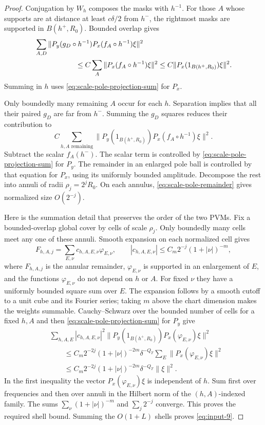 \begin{proof}
Conjugation by $W_h$ composes the masks with $h^{-1}$.  For those
$A$ whose supports are at distance at least $c\delta/2$ from $h^-$,
the rightmost masks are supported in $B(h^+,R_0)$.  Bounded overlap
gives
\begin{align*}
 &\sum_{A,D}
 \|P_y(g_D\circ h^{-1})P_x(f_A\circ h^{-1})\xi\|^2\\
 &\hspace{20mm}\le
 C\sum_A\|P_x(f_A\circ h^{-1})\xi\|^2
 \le C\|P_x(1_{B(h^+,R_0)})\xi\|^2.
\end{align*}
Summing in $h$ uses \eqref{eq:scale-pole-projection-sum} for $P_x$.

Only boundedly many remaining $A$ occur for each $h$.  Separation
implies that all their paired $g_D$ are far from $h^-$.  Summing the
$g_D$ squares reduces their contribution to
\[
 C\sum_{h,A\text{ remaining}}
 \|P_y(1_{B(h^+,R_0)})P_x(f_A\circ h^{-1})\xi\|^2.
\]
Subtract the scalar $f_A(h^-)$.  The scalar term is controlled by
\eqref{eq:scale-pole-projection-sum} for $P_y$.  The remainder in an
enlarged pole ball is controlled by that equation for $P_x$, using
its uniformly bounded amplitude.  Decompose the rest into annuli of
radii $\rho_j=2^jR_0$.  On each annulus,
\eqref{eq:scale-pole-remainder} gives normalized size $O(2^{-j})$.

Here is the summation detail that preserves the order of the two
PVMs.  Fix a bounded-overlap global cover by cells of scale $\rho_j$.
Only boundedly many cells meet any one of these annuli.  Smooth
expansion on each normalized cell gives
\[
 F_{h,A,j}=
 \sum_{E,\nu}c_{h,A,E,\nu}\varphi_{E,\nu},\qquad
 |c_{h,A,E,\nu}|
 \le C_m2^{-j}(1+|\nu|)^{-m},
\]
where $F_{h,A,j}$ is the annular remainder,
$\varphi_{E,\nu}$ is supported in an enlargement of $E$, and the
functions $\varphi_{E,\nu}$ do not depend on $h$ or $A$.  For fixed
$\nu$ they have a uniformly bounded square sum over $E$.  The
expansion follows by a smooth cutoff to a unit cube and its Fourier
series; taking $m$ above the chart dimension makes the weights
summable.  Cauchy--Schwarz over the bounded number of cells for a
fixed $h,A$ and then \eqref{eq:scale-pole-projection-sum} for $P_y$
give
\begin{align*}
 &\sum_{h,A,E}|c_{h,A,E,\nu}|^2
 \|P_y(1_{B(h^+,R_0)})P_x(\varphi_{E,\nu})\xi\|^2\\
 &\qquad\le
 C_m2^{-2j}(1+|\nu|)^{-2m}\delta^{-Q_T}
 \sum_E\|P_x(\varphi_{E,\nu})\xi\|^2\\
 &\qquad\le
 C_m2^{-2j}(1+|\nu|)^{-2m}\delta^{-Q_T}\|\xi\|^2.
\end{align*}
In the first inequality the vector $P_x(\varphi_{E,\nu})\xi$ is
independent of $h$.  Sum first over frequencies and then over
annuli in the Hilbert norm of the $(h,A)$-indexed family.  The sums
$\sum_\nu(1+|\nu|)^{-m}$ and $\sum_j2^{-j}$ converge.  This proves
the required shell bound.  Summing the $O(1+L)$ shells proves
\eqref{eq:input-9}.
\end{proof}


